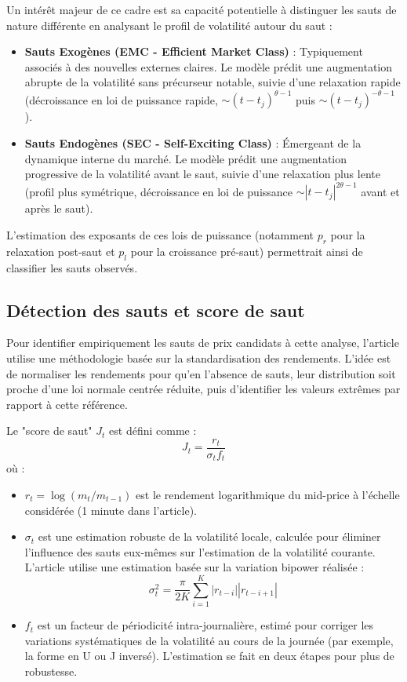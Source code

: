 \documentclass[10pt,a4paper]{article}
\theoremstyle{definition}
\theoremstyle{remark}
\begin{document}
\begin{itemize}
    Un intérêt majeur de ce cadre est sa capacité potentielle à distinguer les sauts de nature différente en analysant le profil de volatilité autour du saut :
    \begin{itemize}
        \item \textbf{Sauts Exogènes (EMC - Efficient Market Class)} : Typiquement associés à des nouvelles externes claires. Le modèle prédit une augmentation abrupte de la volatilité sans précurseur notable, suivie d'une relaxation rapide (décroissance en loi de puissance rapide, $\sim (t-t_j)^{\theta-1}$ puis $\sim (t-t_j)^{-\theta-1}$).
        \item \textbf{Sauts Endogènes (SEC - Self-Exciting Class)} : Émergeant de la dynamique interne du marché. Le modèle prédit une augmentation progressive de la volatilité avant le saut, suivie d'une relaxation plus lente (profil plus symétrique, décroissance en loi de puissance $\sim |t-t_j|^{2\theta-1}$ avant et après le saut).
    \end{itemize}
    L'estimation des exposants de ces lois de puissance (notamment $p_r$ pour la relaxation post-saut et $p_l$ pour la croissance pré-saut) permettrait ainsi de classifier les sauts observés.

    \subsection{Détection des sauts et score de saut}

    Pour identifier empiriquement les sauts de prix candidats à cette analyse, l'article \cite{marcaccioli2021exogenous} utilise une méthodologie basée sur la standardisation des rendements. L'idée est de normaliser les rendements pour qu'en l'absence de sauts, leur distribution soit proche d'une loi normale centrée réduite, puis d'identifier les valeurs extrêmes par rapport à cette référence.

    Le "score de saut" $J_t$ est défini comme :
    \begin{equation}
    J_t = \frac{r_t}{\sigma_t f_t}
    \end{equation}
    où :
    \begin{itemize}
        \item $r_t = \log(m_t / m_{t-1})$ est le rendement logarithmique du mid-price à l'échelle considérée (1 minute dans l'article).
        \item $\sigma_t$ est une estimation robuste de la volatilité locale, calculée pour éliminer l'influence des sauts eux-mêmes sur l'estimation de la volatilité courante. L'article utilise une estimation basée sur la variation bipower réalisée :
        \[ \sigma^2_t = \frac{\pi}{2 K} \sum_{i=1}^{K} |r_{t-i}| |r_{t-i+1}| \]
        \item $f_t$ est un facteur de périodicité intra-journalière, estimé pour corriger les variations systématiques de la volatilité au cours de la journée (par exemple, la forme en U ou J inversé). L'estimation se fait en deux étapes pour plus de robustesse.
    \end{itemize}


\end{itemize}
\end{document}
